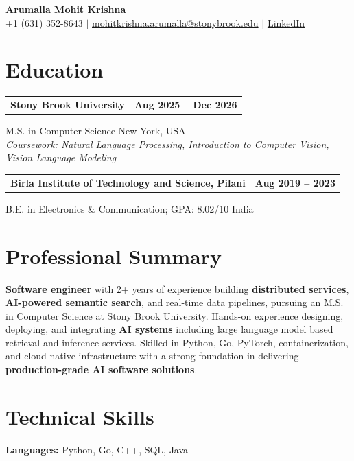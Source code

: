 \documentclass[letterpaper,10pt]{article}
\makeatletter
\newcommand{\entry}[2]{%
  \noindent
  \begin{tabularx}{\linewidth}
    {@{}>{\raggedright\arraybackslash}X@{\hspace{6pt}}r@{}}
    \textbf{#1} & #2
  \end{tabularx}\par
}
\makeatother
\begin{document}
\begin{center}
    {\LARGE\bfseries Arumalla Mohit Krishna}\\[3pt]
    +1 (631) 352-8643 $|$
    \href{mailto:mohitkrishna.arumalla@stonybrook.edu}
    {mohitkrishna.arumalla@stonybrook.edu} $|$
    \href{https://linkedin.com/in/mohit-krishna-arumalla}
    {LinkedIn}
\end{center}
\vspace{-8pt}

\section{Education}

\entry
  {\textbf{Stony Brook University}}
  {\textbf{Aug 2025 -- Dec 2026}}

M.S. in Computer Science \hfill New York, USA\\
\textit{
Coursework: Natural Language Processing,
Introduction to Computer Vision, Vision Language Modeling
}
\vspace{3pt}

\entry
  {\textbf{Birla Institute of Technology and Science, Pilani}}
  {\textbf{Aug 2019 -- 2023}}

B.E. in Electronics \& Communication; GPA: 8.02/10 \hfill India

\section{Professional Summary}

\textbf{Software engineer} with 2+ years of experience building \textbf{distributed services},
\textbf{AI-powered semantic search}, and real-time data pipelines, pursuing an M.S. in Computer
Science at Stony Brook University. Hands-on experience designing, deploying, and integrating
\textbf{AI systems} including large language model based retrieval and inference services. Skilled in
Python, Go, PyTorch, containerization, and cloud-native infrastructure with a strong foundation in
delivering \textbf{production-grade AI software solutions}.

\section{Technical Skills}

\textbf{Languages:}
Python, Go, C++, SQL, Java\\
\end{document}
